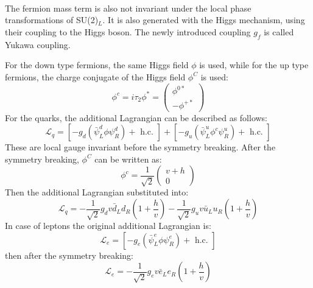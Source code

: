 \\ \\
\noindent\textbf{} \\ 
The fermion mass term is also not invariant under the local phase transformations of SU(2)$_L$. It is also generated with the Higgs mechanism, using their coupling to the Higgs boson. The newly introduced coupling $g_f$ is called Yukawa coupling.

For the down type fermions, the same Higgs field $\phi$ is used, while for the up type fermions, the charge conjugate of the Higgs field $\phi^C$ is used:
\begin{equation}
\phi^{c}=i \tau_{2} \phi^{*}=\left(\begin{array}{c}
\phi^{0 *} \\
-\phi^{+*}
\end{array}\right)
\end{equation}
For the quarks, the additional Lagrangian can be described as follows:
\begin{equation}
\mathcal{L}_{q}=\left[-g_{d}\left(\bar{\psi}_{L}^{d} \phi \psi_{R}^{d}\right)+\text { h.c. }\right]+\left[-g_{u}\left(\bar{\psi}_{L}^{u} \phi^{c} \psi_{R}^{u}\right)+\text { h.c. }\right]
\end{equation}
These are local gauge invariant before the symmetry breaking. After the symmetry breaking, $\phi^C$ can be written as:
\begin{equation}
\phi^{c} 
=\frac{1}{\sqrt{2}}\left(\begin{array}{c}
v+h \\
0
\end{array}\right)
\end{equation}
Then the additional Lagrangian substituted into:
\begin{equation}
\mathcal{L}_{q}=-\frac{1}{\sqrt{2}} g_{d} v \bar{d}_{L} d_{R}\left(1+\frac{h}{v}\right)-\frac{1}{\sqrt{2}} g_{u} v \bar{u}_{L} u_{R}\left(1+\frac{h}{v}\right)
\end{equation}
In case of leptons the original additional Lagrangian is:
\begin{equation}
\mathcal{L}_{e}=\left[-g_{e}\left(\bar{\psi}_{L}^{e} \phi \psi_{R}^{e}\right)+\text { h.c. }\right]
\end{equation}
then after the symmetry breaking:
\begin{equation}
\mathcal{L}_{e}=-\frac{1}{\sqrt{2}} g_{e} v \bar{e}_{L} e_{R}\left(1+\frac{h}{v}\right)
\end{equation}

